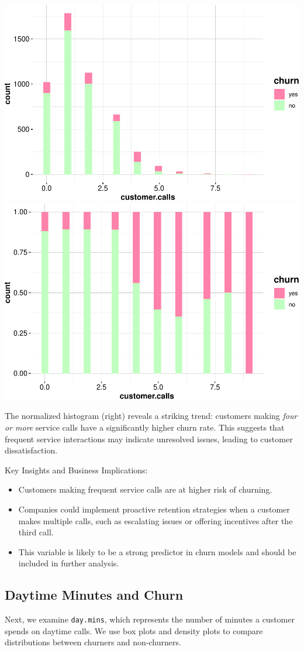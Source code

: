 \documentclass[
]{book}
\newcommand{\passthrough}[1]{#1}
\providecommand{\tightlist}{%
  \setlength{\itemsep}{0pt}\setlength{\parskip}{0pt}}
\theoremstyle{definition}
\theoremstyle{definition}
\theoremstyle{definition}
\theoremstyle{definition}
\theoremstyle{remark}
\begin{document}
\includegraphics[width=0.5\linewidth]{EDA_files/figure-latex/unnamed-chunk-10-1} \includegraphics[width=0.5\linewidth]{EDA_files/figure-latex/unnamed-chunk-10-2}

The normalized histogram (right) reveals a striking trend: customers making \emph{four or more} service calls have a significantly higher churn rate. This suggests that frequent service interactions may indicate unresolved issues, leading to customer dissatisfaction.

Key Insights and Business Implications:

\begin{itemize}
\tightlist
\item
  Customers making frequent service calls are at higher risk of churning.\\
\item
  Companies could implement proactive retention strategies when a customer makes multiple calls, such as escalating issues or offering incentives after the third call.\\
\item
  This variable is likely to be a strong predictor in churn models and should be included in further analysis.
\end{itemize}

\subsection*{Daytime Minutes and Churn}\label{daytime-minutes-and-churn}

Next, we examine \passthrough{\lstinline!day.mins!}, which represents the number of minutes a customer spends on daytime calls. We use box plots and density plots to compare distributions between churners and non-churners.
\end{document}
